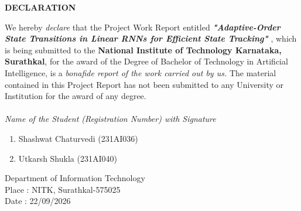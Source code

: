 
\begin{framed}
	\begin{center}
		\textbf{{\Large DECLARATION}}\\
	\end{center}
	\null
	We hereby \textit{declare} that the Project Work Report entitled \textit{\textbf{"Adaptive-Order State Transitions in Linear RNNs for Efficient State Tracking"} },  which is being submitted to the \textbf{National Institute of Technology Karnataka, Surathkal}, for the award of the Degree of Bachelor of Technology in Artificial Intelligence, is a \textit{bonafide report of the work carried out by us.} The material contained in this Project Report has not been submitted to any University or Institution for the award of any degree.
	\\
	\\
	\textit{Name of the Student (Registration Number) with Signature }
	\begin{enumerate}[label={(\arabic*)}]
		\item  Shashwat Chaturvedi (231AI036)
        \item  Utkarsh Shukla  (231AI040)
	\end{enumerate}
	\null
	Department of Information Technology \\
	Place     : NITK, Surathkal-575025 \\
	Date      : 22/09/2026 
	\\
	\\
	\\
	\\
	\\
	\\
	\\
	\\
	\\
	\\
\end{framed}
